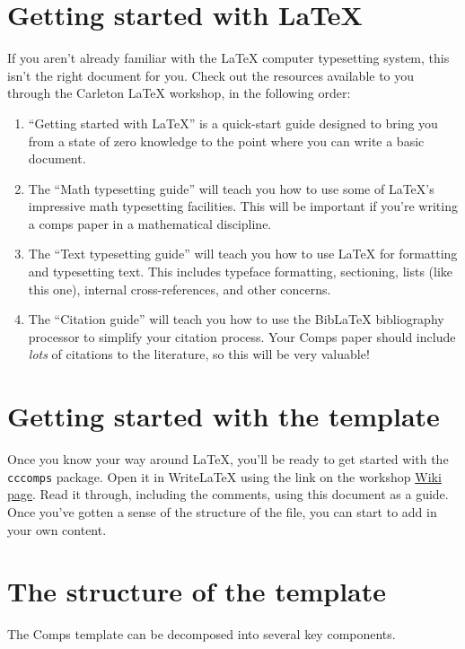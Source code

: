 \documentclass[twoside]{memoir}
\newcommand{\code}[1]{\texttt{#1}}
\begin{document}
\section{Getting started with \LaTeX{}}
\label{s:gettingstarted}
If you aren't already familiar with the \LaTeX{} computer typesetting system, this isn't the right document for you.
Check out the resources available to you through the Carleton \LaTeX{} workshop, in the following order:
\begin{enumerate}
\item
  \enquote{Getting started with \LaTeX{}} is a quick-start guide designed to bring you from a state of zero knowledge to the point where you can write a basic document.

\item
  The \enquote{Math typesetting guide} will teach you how to use some of \LaTeX{}'s impressive math typesetting facilities.
  This will be important if you're writing a comps paper in a mathematical discipline.

\item
  The \enquote{Text typesetting guide} will teach you how to use \LaTeX{} for formatting and typesetting text.
  This includes typeface formatting, sectioning, lists (like this one), internal cross-references, and other concerns.

\item
  The \enquote{Citation guide} will teach you how to use the Bib\LaTeX{} bibliography processor to simplify your citation process.
  Your Comps paper should include \emph{lots} of citations to the literature, so this will be very valuable!
\end{enumerate}

\section{Getting started with the template}
\label{s:template}
Once you know your way around \LaTeX{}, you'll be ready to get started with the \code{cccomps} package.
Open it in Write\LaTeX{} using the link on the workshop \href{http://math.carleton.edu/latex}{Wiki page}.
Read it through, including the comments, using this document as a guide.
Once you've gotten a sense of the structure of the file, you can start to add in your own content.

\section{The structure of the template}
\label{s:structure}
The Comps template can be decomposed into several key components.
\end{document}
